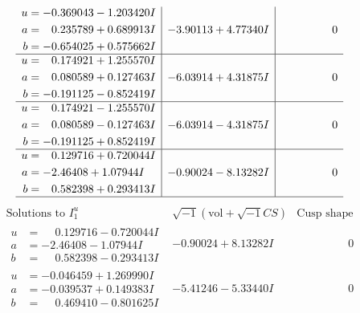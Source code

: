 \documentclass[1p]{elsarticle_modified}
\theoremstyle{definition}
\newcommand{\I}{\sqrt{-1}}
\begin{document}
$$\begin{array}{c|c|c}
\begin{aligned}
u &= -0.369043 - 1.203420 I \\
a &= \phantom{-}0.235789 + 0.689913 I \\
b &= -0.654025 + 0.575662 I\end{aligned}
 & -3.90113 + 4.77340 I & \phantom{-0.000000 } 0 \\ \hline\begin{aligned}
u &= \phantom{-}0.174921 + 1.255570 I \\
a &= \phantom{-}0.080589 + 0.127463 I \\
b &= -0.191125 - 0.852419 I\end{aligned}
 & -6.03914 + 4.31875 I & \phantom{-0.000000 } 0 \\ \hline\begin{aligned}
u &= \phantom{-}0.174921 - 1.255570 I \\
a &= \phantom{-}0.080589 - 0.127463 I \\
b &= -0.191125 + 0.852419 I\end{aligned}
 & -6.03914 - 4.31875 I & \phantom{-0.000000 } 0 \\ \hline\begin{aligned}
u &= \phantom{-}0.129716 + 0.720044 I \\
a &= -2.46408 + 1.07944 I \\
b &= \phantom{-}0.582398 + 0.293413 I\end{aligned}
 & -0.90024 - 8.13282 I & \phantom{-0.000000 } 0\\
 \hline 
 \end{array}$$\newpage$$\begin{array}{c|c|c}  
\text{Solutions to }I^u_{1}& \I (\text{vol} + \sqrt{-1}CS) & \text{Cusp shape}\\
 \hline 
\begin{aligned}
u &= \phantom{-}0.129716 - 0.720044 I \\
a &= -2.46408 - 1.07944 I \\
b &= \phantom{-}0.582398 - 0.293413 I\end{aligned}
 & -0.90024 + 8.13282 I & \phantom{-0.000000 } 0 \\ \hline\begin{aligned}
u &= -0.046459 + 1.269990 I \\
a &= -0.039537 + 0.149383 I \\
b &= \phantom{-}0.469410 - 0.801625 I\end{aligned}
 & -5.41246 - 5.33440 I & \phantom{-0.000000 } 0 \\ \hline\begin{aligned}

\end{aligned}
\end{array}$$
\end{document}
